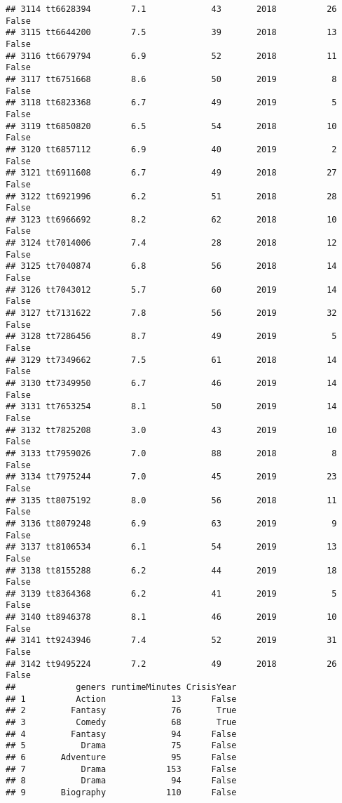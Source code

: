 \documentclass[
]{article}
\begin{document}
\begin{verbatim}
## 3114 tt6628394        7.1             43       2018          26   False
## 3115 tt6644200        7.5             39       2018          13   False
## 3116 tt6679794        6.9             52       2018          11   False
## 3117 tt6751668        8.6             50       2019           8   False
## 3118 tt6823368        6.7             49       2019           5   False
## 3119 tt6850820        6.5             54       2018          10   False
## 3120 tt6857112        6.9             40       2019           2   False
## 3121 tt6911608        6.7             49       2018          27   False
## 3122 tt6921996        6.2             51       2018          28   False
## 3123 tt6966692        8.2             62       2018          10   False
## 3124 tt7014006        7.4             28       2018          12   False
## 3125 tt7040874        6.8             56       2018          14   False
## 3126 tt7043012        5.7             60       2019          14   False
## 3127 tt7131622        7.8             56       2019          32   False
## 3128 tt7286456        8.7             49       2019           5   False
## 3129 tt7349662        7.5             61       2018          14   False
## 3130 tt7349950        6.7             46       2019          14   False
## 3131 tt7653254        8.1             50       2019          14   False
## 3132 tt7825208        3.0             43       2019          10   False
## 3133 tt7959026        7.0             88       2018           8   False
## 3134 tt7975244        7.0             45       2019          23   False
## 3135 tt8075192        8.0             56       2018          11   False
## 3136 tt8079248        6.9             63       2019           9   False
## 3137 tt8106534        6.1             54       2019          13   False
## 3138 tt8155288        6.2             44       2019          18   False
## 3139 tt8364368        6.2             41       2019           5   False
## 3140 tt8946378        8.1             46       2019          10   False
## 3141 tt9243946        7.4             52       2019          31   False
## 3142 tt9495224        7.2             49       2018          26   False
##            geners runtimeMinutes CrisisYear
## 1          Action             13      False
## 2         Fantasy             76       True
## 3          Comedy             68       True
## 4         Fantasy             94      False
## 5           Drama             75      False
## 6       Adventure             95      False
## 7           Drama            153      False
## 8           Drama             94      False
## 9       Biography            110      False

\end{verbatim}
\end{document}

